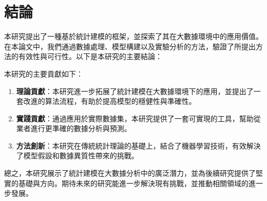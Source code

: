\chapter{結論}
\label{c:conclusions}

本研究提出了一種基於統計建模的框架，並探索了其在大數據環境中的應用價值。在本論文中，我們通過數據處理、模型構建以及實驗分析的方法，驗證了所提出方法的有效性與可行性。以下是本研究的主要結論：

本研究的主要貢獻如下：
\begin{enumerate}
    \item \textbf{理論貢獻}：本研究進一步拓展了統計建模在大數據環境下的應用，並提出了一套改進的算法流程，有助於提高模型的穩健性與準確性。
    \item \textbf{實踐貢獻}：通過應用於實際數據集，本研究提供了一套可實現的工具，幫助從業者進行更準確的數據分析與預測。
    \item \textbf{方法創新}：本研究在傳統統計理論的基礎上，結合了機器學習技術，有效解決了模型假設和數據異質性帶來的挑戰。
\end{enumerate}

總之，本研究展示了統計建模在大數據分析中的廣泛潛力，並為後續研究提供了堅實的基礎與方向。期待未來的研究能進一步解決現有挑戰，並推動相關領域的進一步發展。
